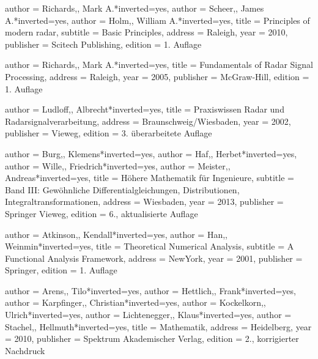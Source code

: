 
\begin{bibdiv}
\begin{biblist}

 {
    author = {{Richards,}, Mark A.}*{inverted={yes}},
    author = {{Scheer,}, James A.}*{inverted={yes}},
    author = {{Holm,}, William A.}*{inverted={yes}},
    title = {Principles of modern radar},
    subtitle = {Basic Principles},
    address = {Raleigh},
    year = {2010},
    publisher = {Scitech Publishing},
    edition = {1. Auflage}
}

 {
    author = {{Richards,}, Mark A.}*{inverted={yes}},
    title = {Fundamentals of Radar Signal Processing},
    address = {Raleigh},
    year = {2005},
    publisher = {McGraw-Hill},
    edition = {1. Auflage}
}

 {
    author = {{Ludloff,}, Albrecht}*{inverted={yes}},
    title = {Praxiswissen Radar und Radarsignalverarbeitung},
    address = {Braunschweig/Wiesbaden},
    year = {2002},
    publisher = {Vieweg},
    edition = {3. überarbeitete Auflage}
}

 {
    author = {{Burg,}, Klemens}*{inverted={yes}},
    author = {{Haf,}, Herbet}*{inverted={yes}},
    author = {{Wille,}, Friedrich}*{inverted={yes}},
    author = {{Meister,}, Andreas}*{inverted={yes}},
    title = {Höhere Mathematik für Ingenieure},
    subtitle = {Band III: Gewöhnliche Differentialgleichungen, Distributionen, Integraltransformationen},
    address = {Wiesbaden},
    year = {2013},
    publisher = {Springer Vieweg},
    edition = {6., aktualisierte Auflage}
}

 {
    author = {{Atkinson,}, Kendall}*{inverted={yes}},
    author = {{Han,}, Weinmin}*{inverted={yes}},
    title = {Theoretical Numerical Analysis},
    subtitle = {A Functional Analysis Framework},
    address = {NewYork},
    year = {2001},
    publisher = {Springer},
    edition = {1. Auflage}
}

 {
    author = {{Arens,}, Tilo}*{inverted={yes}},
    author = {{Hettlich,}, Frank}*{inverted={yes}},
    author = {{Karpfinger,}, Christian}*{inverted={yes}},
    author = {{Kockelkorn,}, Ulrich}*{inverted={yes}},
    author = {{Lichtenegger,}, Klaus}*{inverted={yes}},
    author = {{Stachel,}, Hellmuth}*{inverted={yes}},
    title = {Mathematik},
    address = {Heidelberg},
    year = {2010},
    publisher = {Spektrum Akademischer Verlag},
    edition = {2., korrigierter Nachdruck}
}


\end{biblist}
\end{bibdiv}
